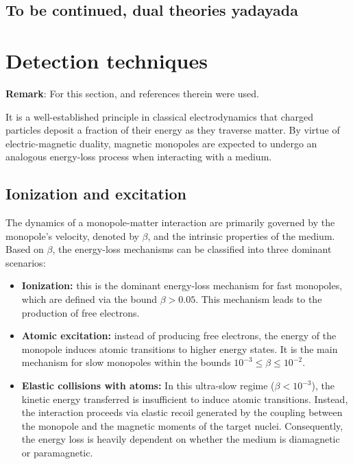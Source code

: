 \documentclass[a4paper,11pt]{article}
\begin{document}
\subsection{To be continued, dual theories yadayada}

\section{Detection techniques}
\textbf{Remark}: For this section, \cite{2016,mitsou2026magneticmonopolesdirac} and references therein were used.

It is a well-established principle in classical electrodynamics that charged particles deposit a fraction of their energy as they traverse matter. By virtue of electric-magnetic duality, magnetic monopoles are expected to undergo an analogous energy-loss process when interacting with a medium.
\subsection{Ionization and excitation}\label{51}
The dynamics of a monopole-matter interaction are primarily governed by the monopole's velocity, denoted by $\beta$, and the intrinsic properties of the medium. Based on $\beta$, the energy-loss mechanisms can be classified into three dominant scenarios:
 \begin{itemize}
    \item \textbf{Ionization:} this is the dominant energy-loss mechanism for fast monopoles, which are defined via the bound $\beta> 0.05$. This mechanism leads to the production of free electrons.
    \item \textbf{Atomic excitation:} instead of producing free electrons, the energy of the monopole induces atomic transitions to higher energy states. It is the main mechanism for slow monopoles within the bounds $10^{-3}\le \beta \le 10^{-2}$.
    \item \textbf{Elastic collisions with atoms:} In this ultra-slow regime ($\beta<10^{-3}$), the kinetic energy transferred is insufficient to induce atomic transitions. Instead, the interaction proceeds via elastic recoil generated by the coupling between the monopole and the magnetic moments of the target nuclei. Consequently, the energy loss is heavily dependent on whether the medium is diamagnetic or paramagnetic.
 \end{itemize}
 
\end{document}
